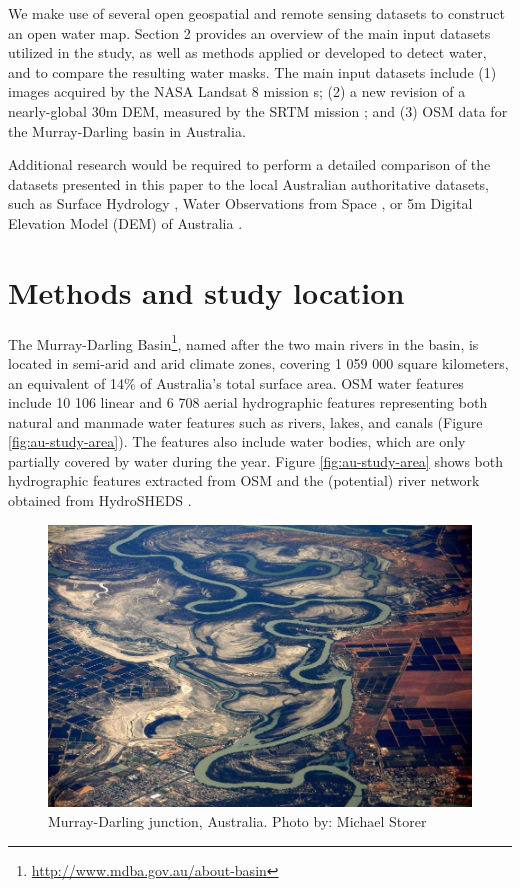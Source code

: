 We make use of several open geospatial and remote sensing datasets to construct an open water map. Section 2 provides an overview of the main input datasets utilized in the study, as well as methods applied or developed to detect water, and to compare the resulting water masks. The main input datasets include (1) images acquired by the NASA Landsat 8 mission \citet{Roy2014}s; (2) a new revision of a nearly-global 30m DEM, measured by the \gls{SRTM} mission \citet{dataSRTM}; and (3) OSM data for the Murray-Darling basin in Australia. 

Additional research would be required to perform a detailed comparison of the datasets presented in this paper to the local Australian authoritative datasets, such as Surface Hydrology \citet{CrossmanSLi2015}, Water Observations from Space \citet{Mueller2015}, or 5m Digital Elevation Model (DEM) of Australia \citet{dataAUDEM5m}.

\section{Methods and study location}
The Murray-Darling Basin\footnote{\url{http://www.mdba.gov.au/about-basin}}, named after the two main rivers in the basin, is located in semi-arid and arid climate zones, covering 1 059 000 square kilometers, an equivalent of 14\% of Australia’s total surface area. OSM water features include 10 106 linear and 6 708 aerial hydrographic features representing both natural and manmade water features such as rivers, lakes, and canals (Figure \ref{fig:au-study-area}). The features also include water bodies, which are only partially covered by water during the year. Figure \ref{fig:au-study-area} shows both hydrographic features extracted from OSM and the (potential) river network obtained from HydroSHEDS \citet{Lehner2008}. 

\begin{figure}[H]
	\centering
	\includegraphics[width=1\textwidth]{01.9-water-murray-darling/figures/water_Murray-Darling-junction}
	\caption{Murray-Darling junction, Australia. Photo by: Michael Storer}
\end{figure}



